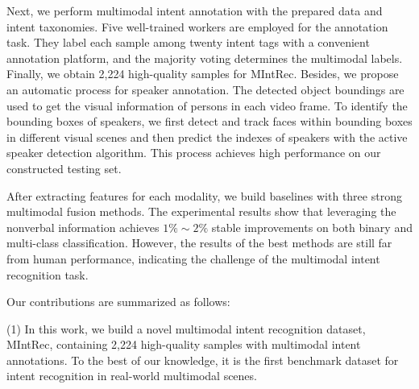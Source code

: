 \documentclass[sigconf,camera-ready]{acmart}
\begin{document}
Next, we perform multimodal intent annotation with the prepared data and intent taxonomies. Five well-trained workers are employed for the annotation task. They label each sample among twenty intent tags with a convenient annotation platform, and the majority voting determines the multimodal labels. Finally, we obtain 2,224 high-quality samples for MIntRec. Besides, we propose an automatic process for speaker annotation. The detected object boundings are used to get the visual information of persons in each video frame. To identify the bounding boxes of speakers, we first detect and track faces within bounding boxes in different visual scenes and then predict the indexes of speakers with the active speaker detection algorithm. This process achieves high performance on our constructed testing set. 

After extracting features for each modality, we build baselines with three strong multimodal fusion methods. The experimental results show that leveraging the nonverbal information achieves $1\%\sim2\%$ stable improvements on both binary and multi-class classification. However, the results of the best methods are still far from human performance, indicating the challenge of the multimodal intent recognition task. 

Our contributions are summarized as follows:

(1) In this work, we build a novel multimodal intent recognition dataset, MIntRec, containing 2,224 high-quality samples with multimodal intent annotations. To the best of our knowledge, it is the first benchmark dataset for intent recognition in real-world multimodal scenes. 
\end{document}
